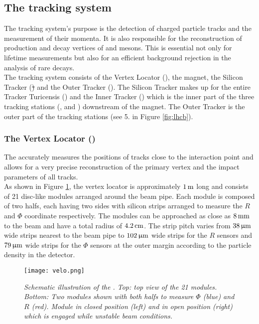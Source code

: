 \subsection{The tracking system}
The \lhcb tracking system's purpose is the detection of charged particle tracks and the measurement of their momenta. It is also responsible for the reconstruction of production and decay vertices of \B and \D mesons. This is essential not only for lifetime measurements but also for an efficient background rejection in the analysis of rare decays.\\
The tracking system consists of the Vertex Locator (\velo), the magnet, the Silicon Tracker (\st) and the Outer Tracker (\ot). The Silicon Tracker makes up for the entire Tracker Turicensis (\ttracker) and the Inner Tracker (\intr) which is the inner part of the three tracking stations (\Tone, \Ttwo and \Tthree) downstream of the magnet. The Outer Tracker is the outer part of the tracking stations (see 5. in Figure \ref{fig:lhcb}).
\\

\subsubsection{The Vertex Locator (\velo)}
The \velo \cite{velo} accurately measures the positions of tracks close to the interaction point and allows for a very precise reconstruction of the primary vertex and the impact parameters of all tracks.\\
As shown in Figure \ref{fig:velo}, the vertex locator is approximately $1 \rm \,m$ long and consists of 21 disc-like modules arranged around the beam pipe. Each module is composed of two halfs, each having two sides with silicon strips arranged to measure the $R$ and $\Phi$ coordinate respectively. The modules can be approached as close as $8\rm \,mm$ to the beam and have a total radius of $4.2 \rm \,cm$. The strip pitch varies from $38 \,\upmu\rm m $ wide strips nearest to the beam pipe to $102 \,\upmu\rm m$ wide strips for the $R$ sensors and $79 \,\upmu\rm m$ wide strips for the $\Phi$ sensors at the outer margin according to the particle density in the detector.\\
\begin{figure}[h]
  \begin{center}
  	\vspace*{-0.8cm}
    \texttt{[image: velo.png]}
  \vspace*{-1.0cm}
  \end{center}
  \caption{\textit{Schematic illustration of the \velo. Top: top view of the 21 modules. Bottom: Two \velo modules shown with both halfs to measure $\Phi$ (blue) and $R$ (red). Module in closed position (left) and in open position (right) which is engaged while unstable beam conditions.}\cite{velo}}
  \label{fig:velo}
\end{figure}


